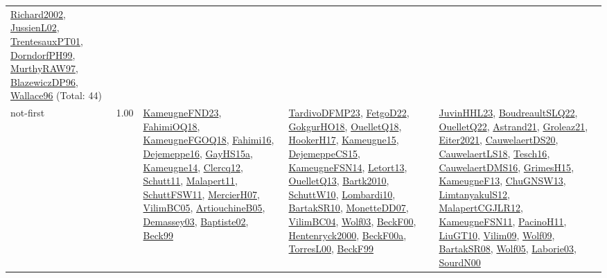 {\begin{longtable}{p{3cm}r>{\raggedright\arraybackslash}p{6cm}>{\raggedright\arraybackslash}p{6cm}>{\raggedright\arraybackslash}p{8cm}}
\hyperref[detail:Richard2002]{Richard2002}, \hyperref[detail:JussienL02]{JussienL02}, \hyperref[detail:TrentesauxPT01]{TrentesauxPT01}, \hyperref[detail:DorndorfPH99]{DorndorfPH99}, \hyperref[detail:MurthyRAW97]{MurthyRAW97}, \hyperref[detail:BlazewiczDP96]{BlazewiczDP96}, \hyperref[detail:Wallace96]{Wallace96} (Total: 44)\\
\index{not-first}\index{Algorithms!not-first}not-first &  1.00 & \hyperref[detail:KameugneFND23]{KameugneFND23}, \hyperref[detail:FahimiOQ18]{FahimiOQ18}, \hyperref[detail:KameugneFGOQ18]{KameugneFGOQ18}, \hyperref[detail:Fahimi16]{Fahimi16}, \hyperref[detail:Dejemeppe16]{Dejemeppe16}, \hyperref[detail:GayHS15a]{GayHS15a}, \hyperref[detail:Kameugne14]{Kameugne14}, \hyperref[detail:Clercq12]{Clercq12}, \hyperref[detail:Schutt11]{Schutt11}, \hyperref[detail:Malapert11]{Malapert11}, \hyperref[detail:SchuttFSW11]{SchuttFSW11}, \hyperref[detail:MercierH07]{MercierH07}, \hyperref[detail:VilimBC05]{VilimBC05}, \hyperref[detail:ArtiouchineB05]{ArtiouchineB05}, \hyperref[detail:Demassey03]{Demassey03}, \hyperref[detail:Baptiste02]{Baptiste02}, \hyperref[detail:Beck99]{Beck99} & \hyperref[detail:TardivoDFMP23]{TardivoDFMP23}, \hyperref[detail:FetgoD22]{FetgoD22}, \hyperref[detail:GokgurHO18]{GokgurHO18}, \hyperref[detail:OuelletQ18]{OuelletQ18}, \hyperref[detail:HookerH17]{HookerH17}, \hyperref[detail:Kameugne15]{Kameugne15}, \hyperref[detail:DejemeppeCS15]{DejemeppeCS15}, \hyperref[detail:KameugneFSN14]{KameugneFSN14}, \hyperref[detail:Letort13]{Letort13}, \hyperref[detail:OuelletQ13]{OuelletQ13}, \hyperref[detail:Bartk2010]{Bartk2010}, \hyperref[detail:SchuttW10]{SchuttW10}, \hyperref[detail:Lombardi10]{Lombardi10}, \hyperref[detail:BartakSR10]{BartakSR10}, \hyperref[detail:MonetteDD07]{MonetteDD07}, \hyperref[detail:VilimBC04]{VilimBC04}, \hyperref[detail:Wolf03]{Wolf03}, \hyperref[detail:BeckF00]{BeckF00}, \hyperref[detail:Hentenryck2000]{Hentenryck2000}, \hyperref[detail:BeckF00a]{BeckF00a}, \hyperref[detail:TorresL00]{TorresL00}, \hyperref[detail:BeckF99]{BeckF99} & \hyperref[detail:JuvinHHL23]{JuvinHHL23}, \hyperref[detail:BoudreaultSLQ22]{BoudreaultSLQ22}, \hyperref[detail:OuelletQ22]{OuelletQ22}, \hyperref[detail:Astrand21]{Astrand21}, \hyperref[detail:Groleaz21]{Groleaz21}, \hyperref[detail:Eiter2021]{Eiter2021}, \hyperref[detail:CauwelaertDS20]{CauwelaertDS20}, \hyperref[detail:CauwelaertLS18]{CauwelaertLS18}, \hyperref[detail:Tesch16]{Tesch16}, \hyperref[detail:CauwelaertDMS16]{CauwelaertDMS16}, \hyperref[detail:GrimesH15]{GrimesH15}, \hyperref[detail:KameugneF13]{KameugneF13}, \hyperref[detail:ChuGNSW13]{ChuGNSW13}, \hyperref[detail:LimtanyakulS12]{LimtanyakulS12}, \hyperref[detail:MalapertCGJLR12]{MalapertCGJLR12}, \hyperref[detail:KameugneFSN11]{KameugneFSN11}, \hyperref[detail:PacinoH11]{PacinoH11}, \hyperref[detail:LiuGT10]{LiuGT10}, \hyperref[detail:Vilim09]{Vilim09}, \hyperref[detail:Wolf09]{Wolf09}, \hyperref[detail:BartakSR08]{BartakSR08}, \hyperref[detail:Wolf05]{Wolf05}, \hyperref[detail:Laborie03]{Laborie03}, \hyperref[detail:SourdN00]{SourdN00}\\

\end{longtable}}
